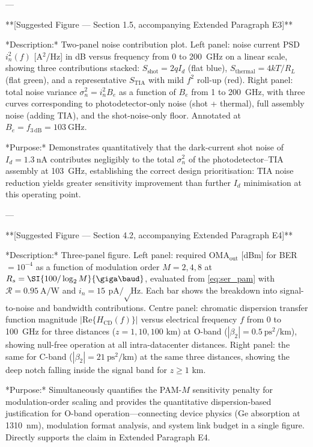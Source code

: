 ---

**[Suggested Figure — Section 1.5, accompanying Extended Paragraph E3]**

*Description:* Two-panel noise contribution plot. Left panel: noise current PSD $i_n^2(f)$ [A$^2$/Hz] in dB versus frequency from 0 to \SI{200}{\giga\hertz} on a linear scale, showing three contributions stacked: $S_\mathrm{shot} = 2qI_d$ (flat blue), $S_\mathrm{thermal} = 4kT/R_L$ (flat green), and a representative $S_\mathrm{TIA}$ with mild $f^2$ roll-up (red). Right panel: total noise variance $\sigma_n^2 = i_n^2 B_e$ as a function of $B_e$ from 1 to \SI{200}{\giga\hertz}, with three curves corresponding to photodetector-only noise (shot + thermal), full assembly noise (adding TIA), and the shot-noise-only floor. Annotated at $B_e = f_{3\,\mathrm{dB}} = \SI{103}{\giga\hertz}$.

*Purpose:* Demonstrates quantitatively that the dark-current shot noise of $I_d = \SI{1.3}{\nano\ampere}$ contributes negligibly to the total $\sigma_n^2$ of the photodetector–TIA assembly at \SI{103}{\giga\hertz}, establishing the correct design prioritisation: TIA noise reduction yields greater sensitivity improvement than further $I_d$ minimisation at this operating point.

---

**[Suggested Figure — Section 4.2, accompanying Extended Paragraph E4]**

*Description:* Three-panel figure. Left panel: required $\mathrm{OMA}_\mathrm{out}$ [dBm] for BER $= 10^{-4}$ as a function of modulation order $M = 2, 4, 8$ at $R_s = \SI{100/\log_2 M}{\giga\baud}$, evaluated from \cref{eq:ser_pam} with $\mathcal{R} = \SI{0.95}{\ampere\per\watt}$ and $i_n = \SI{15}{\pico\ampere\per\sqrt\hertz}$. Each bar shows the breakdown into signal-to-noise and bandwidth contributions. Centre panel: chromatic dispersion transfer function magnitude $|\mathrm{Re}\{H_\mathrm{CD}(f)\}|$ versus electrical frequency $f$ from 0 to \SI{100}{\giga\hertz} for three distances ($z = 1, 10, 100$ km) at O-band ($|\beta_2| = \SI{0.5}{\pico\second\squared\per\kilo\metre}$), showing null-free operation at all intra-datacenter distances. Right panel: the same for C-band ($|\beta_2| = \SI{21}{\pico\second\squared\per\kilo\metre}$) at the same three distances, showing the deep notch falling inside the signal band for $z \geq 1$ km.

*Purpose:* Simultaneously quantifies the PAM-$M$ sensitivity penalty for modulation-order scaling and provides the quantitative dispersion-based justification for O-band operation—connecting device physics (Ge absorption at \SI{1310}{\nano\metre}), modulation format analysis, and system link budget in a single figure. Directly supports the claim in Extended Paragraph E4.

